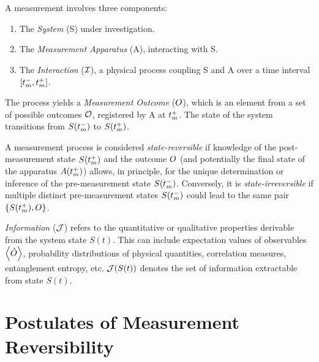 	\begin{definition}
		A measurement involves three components:
		\begin{enumerate}
			\item The \emph{System} (S) under investigation.
			\item The \emph{Measurement Apparatus} (A), interacting with S.
			\item The \emph{Interaction} ($\mathcal{I}$), a physical process coupling S and A over a time interval $[t_m^-, t_m^+]$.
		\end{enumerate}
		The process yields a \emph{Measurement Outcome} ($O$), which is an element from a set of possible outcomes $\mathcal{O}$, registered by A at $t_m^+$. The state of the system transitions from $S(t_m^-)$ to $S(t_m^+)$.
	\end{definition}
	
	\begin{definition}
		A measurement process is considered \emph{state-reversible} if knowledge of the post-measurement state $S(t_m^+)$ and the outcome $O$ (and potentially the final state of the apparatus $A(t_m^+)$) allows, in principle, for the unique determination or inference of the pre-measurement state $S(t_m^-)$. Conversely, it is \emph{state-irreversible} if multiple distinct pre-measurement states $S(t_m^-)$ could lead to the same pair $\{S(t_m^+), O\}$.
	\end{definition}
	
	\begin{definition}
		\emph{Information} ($\mathcal{J}$) refers to the quantitative or qualitative properties derivable from the system state $S(t)$. This can include expectation values of observables $\left\langle{\hat{O}}\right\rangle$, probability distributions of physical quantities, correlation measures, entanglement entropy, etc. $\mathcal{J}(S(t))$ denotes the set of information extractable from state $S(t)$.
	\end{definition}
	
	
	\section{Postulates of Measurement Reversibility}
	
